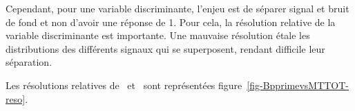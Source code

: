 \par
Cependant,
pour une variable discriminante,
l'enjeu est de séparer signal et bruit de fond
et non d'avoir une réponse de 1.
Pour cela, la résolution relative de la variable discriminante est importante.
Une mauvaise résolution étale les distributions des différents signaux qui se superposent, rendant difficile leur séparation.
\par
Les résolutions relatives de \mTtot\ et \mml\
sont représentées figure~\ref{fig-BpprimevsMTTOT-reso}.
%
%
%
